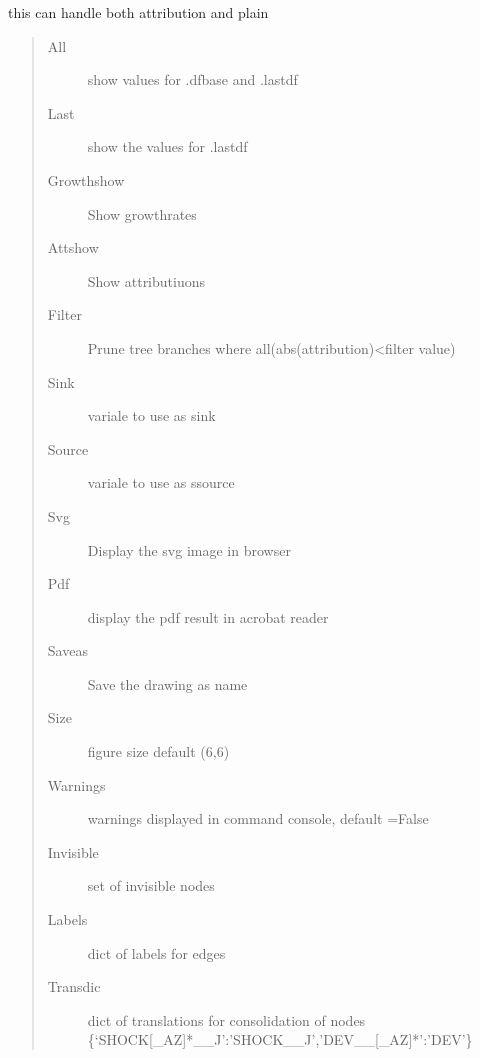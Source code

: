 \documentclass[letterpaper,10pt,english]{sphinxmanual}
\begin{document}
\begin{fulllineitems}
\begin{fulllineitems}
\sphinxAtStartPar
this can handle both attribution and plain
\begin{quote}\begin{description}
\item[{All}] \leavevmode
\sphinxAtStartPar
show values for .dfbase and .lastdf

\item[{Last}] \leavevmode
\sphinxAtStartPar
show the values for .lastdf

\item[{Growthshow}] \leavevmode
\sphinxAtStartPar
Show growthrates

\item[{Attshow}] \leavevmode
\sphinxAtStartPar
Show attributiuons

\item[{Filter}] \leavevmode
\sphinxAtStartPar
Prune tree branches where all(abs(attribution)\textless{}filter value)

\item[{Sink}] \leavevmode
\sphinxAtStartPar
variale to use as sink

\item[{Source}] \leavevmode
\sphinxAtStartPar
variale to use as ssource

\item[{Svg}] \leavevmode
\sphinxAtStartPar
Display the svg image in browser

\item[{Pdf}] \leavevmode
\sphinxAtStartPar
display the pdf result in acrobat reader

\item[{Saveas}] \leavevmode
\sphinxAtStartPar
Save the drawing as name

\item[{Size}] \leavevmode
\sphinxAtStartPar
figure size default (6,6)

\item[{Warnings}] \leavevmode
\sphinxAtStartPar
warnings displayed in command console, default =False

\item[{Invisible}] \leavevmode
\sphinxAtStartPar
set of invisible nodes

\item[{Labels}] \leavevmode
\sphinxAtStartPar
dict of labels for edges

\item[{Transdic}] \leavevmode
\sphinxAtStartPar
dict of translations for consolidation of nodes \{‘SHOCK{[}\_A\sphinxhyphen{}Z{]}*\_\_J’:’SHOCK\_\_J’,’DEV\_\_{[}\_A\sphinxhyphen{}Z{]}*’:’DEV’\}


\end{description}
\end{quote}
\end{fulllineitems}
\end{fulllineitems}
\end{document}

